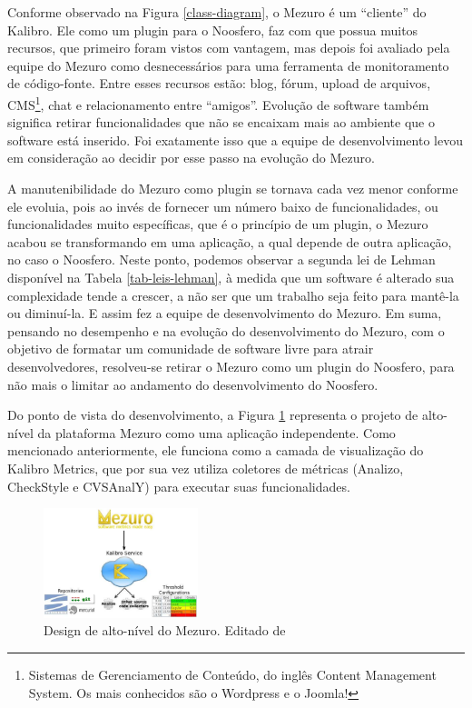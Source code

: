 Conforme observado na Figura \ref{class-diagram}, o Mezuro é um ``cliente'' do Kalibro. Ele como um plugin para o Noosfero, faz com que possua muitos recursos, que primeiro foram vistos com vantagem, mas depois foi avaliado pela equipe do Mezuro como desnecessários para uma ferramenta de monitoramento de código-fonte. Entre esses recursos estão: blog, fórum, upload de arquivos, CMS\footnote{Sistemas de Gerenciamento de Conteúdo, do inglês Content Management System. Os mais conhecidos são o Wordpress e o Joomla!}, chat e relacionamento entre  ``amigos''. Evolução de software também significa retirar funcionalidades que não se encaixam mais ao ambiente que o software está inserido. Foi exatamente isso que a equipe de desenvolvimento levou em consideração ao decidir por esse passo na evolução do Mezuro.

A manutenibilidade do Mezuro como plugin se tornava cada vez menor conforme ele evoluia, pois ao invés de fornecer um número baixo de funcionalidades, ou funcionalidades muito específicas, que é o princípio de um plugin, o Mezuro acabou se transformando em uma aplicação, a qual depende de outra aplicação, no caso o Noosfero. Neste ponto, podemos observar a segunda lei de Lehman disponível na Tabela \ref{tab-leis-lehman}, à medida que um software é alterado sua complexidade tende a crescer, a não ser que um trabalho seja feito para mantê-la ou diminuí-la. E assim fez a equipe de desenvolvimento do Mezuro.
%
Em suma, pensando no desempenho e na evolução do desenvolvimento do Mezuro, com o objetivo de formatar um comunidade de software livre para atrair desenvolvedores, resolveu-se retirar o Mezuro como um plugin do Noosfero, para não mais o limitar ao andamento do desenvolvimento do Noosfero. 

Do ponto de vista do desenvolvimento, a Figura \ref{mezuro-design} representa o projeto de alto-nível da plataforma Mezuro como uma aplicação independente. Como mencionado anteriormente, ele funciona como a camada de visualização do Kalibro Metrics, que por sua vez utiliza coletores de métricas (Analizo, CheckStyle e CVSAnalY) para executar suas funcionalidades.

\graphicspath{{figuras/}}
\begin{figure}[htpb]
\centering
\includegraphics[width=0.4\textwidth]{mezuro-standalone-design}
\caption{Design de alto-nível do Mezuro. Editado de \cite{meirelles2010mezuro}}
\label{mezuro-design}
\end{figure}

